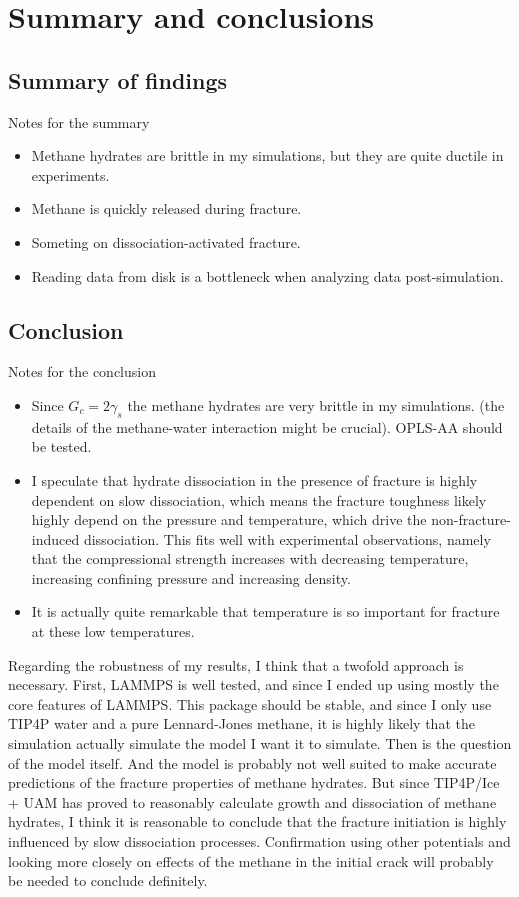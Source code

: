 \chapter{Summary and conclusions}
\label{ch:summary_conclusions}
\section{Summary of findings}
Notes for the summary
\begin{itemize}
\item Methane hydrates are brittle in my simulations, but they are quite ductile in experiments.
\item Methane is quickly released during fracture.
\item Someting on dissociation-activated fracture.
\item Reading data from disk is a bottleneck when analyzing data post-simulation. 
\end{itemize}

\section{Conclusion}
Notes for the conclusion
\begin{itemize}
\item Since $G_c = 2\gamma_s$ the methane hydrates are very brittle in my simulations. (the details of the methane-water interaction might be crucial). OPLS-AA should be tested.
\item I speculate that hydrate dissociation in the presence of fracture is highly dependent on slow dissociation, which means the fracture toughness likely highly depend on the pressure and temperature, which drive the non-fracture-induced dissociation. This fits well with experimental observations, namely that the compressional strength increases with decreasing temperature, increasing confining pressure and increasing density.
\item It is actually quite remarkable that temperature is so important for fracture at these low temperatures.
\end{itemize}

Regarding the robustness of my results, I think that a twofold approach is necessary. First, LAMMPS is well tested, and since I ended up using mostly the core features of LAMMPS. This package should be stable, and since I only use TIP4P water and a pure Lennard-Jones methane, it is highly likely that the simulation actually simulate the model I want it to simulate. Then is the question of the model itself. And the model is probably not well suited to make accurate predictions of the fracture properties of methane hydrates. But since TIP4P/Ice + UAM has proved to reasonably calculate growth and dissociation of methane hydrates, I think it is reasonable to conclude that the fracture initiation is highly influenced by slow dissociation processes. Confirmation using other potentials and looking more closely on effects of the methane in the initial crack will probably be needed to conclude definitely.


